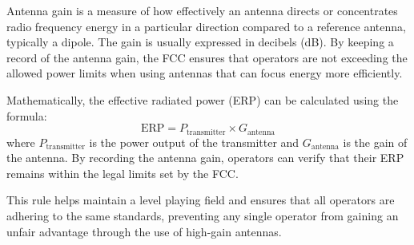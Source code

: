 Antenna gain is a measure of how effectively an antenna directs or concentrates radio frequency energy in a particular direction compared to a reference antenna, typically a dipole. The gain is usually expressed in decibels (dB). By keeping a record of the antenna gain, the FCC ensures that operators are not exceeding the allowed power limits when using antennas that can focus energy more efficiently.

Mathematically, the effective radiated power (ERP) can be calculated using the formula:
\[
\text{ERP} = P_{\text{transmitter}} \times G_{\text{antenna}}
\]
where \( P_{\text{transmitter}} \) is the power output of the transmitter and \( G_{\text{antenna}} \) is the gain of the antenna. By recording the antenna gain, operators can verify that their ERP remains within the legal limits set by the FCC.

This rule helps maintain a level playing field and ensures that all operators are adhering to the same standards, preventing any single operator from gaining an unfair advantage through the use of high-gain antennas.

